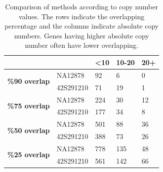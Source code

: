 \begin{table}[]
\centering
\begin{tabular}{lllll}
\hline
\multicolumn{2}{l}{}                                                                         & \textbf{\textless{}10} & \textbf{10-20} & \textbf{20+} \\ \hline
\multicolumn{1}{l|}{\multirow{2}{*}{\textbf{\%90 overlap}}} & \multicolumn{1}{l|}{NA12878}   & 92                        & 6              & 0            \\ \cline{2-5} 
\multicolumn{1}{l|}{}                                       & \multicolumn{1}{l|}{42S291210} & 71                        & 19             & 1            \\ \hline
\multicolumn{1}{l|}{\multirow{2}{*}{\textbf{\%75 overlap}}} & \multicolumn{1}{l|}{NA12878}   & 224                       & 30             & 12           \\ \cline{2-5} 
\multicolumn{1}{l|}{}                                       & \multicolumn{1}{l|}{42S291210} & 177                       & 34             & 8            \\ \hline
\multicolumn{1}{l|}{\multirow{2}{*}{\textbf{\%50 overlap}}} & \multicolumn{1}{l|}{NA12878}   & 501                       & 88             & 36           \\ \cline{2-5} 
\multicolumn{1}{l|}{}                                       & \multicolumn{1}{l|}{42S291210} & 388                       & 73             & 26           \\ \hline
\multicolumn{1}{l|}{\multirow{2}{*}{\textbf{\%25 overlap}}} & \multicolumn{1}{l|}{NA12878}   & 778                       & 135            & 48           \\ \cline{2-5} 
\multicolumn{1}{l|}{}                                       & \multicolumn{1}{l|}{42S291210} & 561                       & 142            & 66           \\ \hline
\end{tabular}
\caption{Comparison of methods according to copy number values. The rows indicate the overlapping percentage and the columns indicate absolute copy numbers. Genes having higher absolute copy number often have lower overlapping.}
\label{overlapVScnvNo}
\end{table}